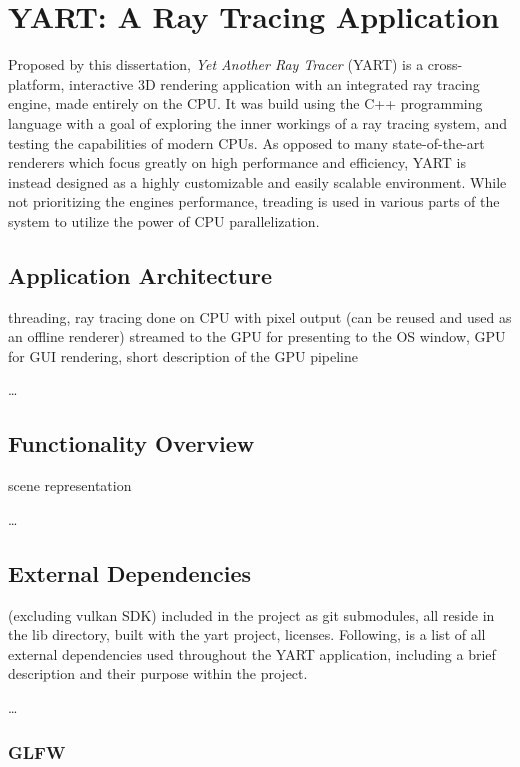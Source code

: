 \chapter{YART: A Ray Tracing Application} \label{ch:Application}

Proposed by this dissertation, \textit{Yet Another Ray Tracer} (YART) is a cross-platform, interactive 3D rendering application with an integrated ray tracing engine, made entirely on the CPU. 
It was build using the C++ programming language with a goal of exploring the inner workings of a ray tracing system, and testing the capabilities of modern CPUs.
As opposed to many state-of-the-art renderers which focus greatly on high performance and efficiency, YART is instead designed as a highly customizable and easily scalable environment. 
While not prioritizing the engines performance, treading is used in various parts of the system to utilize the power of CPU parallelization.

\section{Application Architecture}

threading, ray tracing done on CPU with pixel output (can be reused and used as an offline renderer) streamed to the GPU for presenting to the OS window, GPU for GUI rendering, short description of the GPU pipeline 

\dots

\section{Functionality Overview}

scene representation

\dots

\section{External Dependencies}

(excluding vulkan SDK) included in the project as git submodules, all reside in the lib directory, built with the yart project, licenses.
Following, is a list of all external dependencies used throughout the YART application, including a brief description and their purpose within the project.

\dots

\subsection{GLFW}

